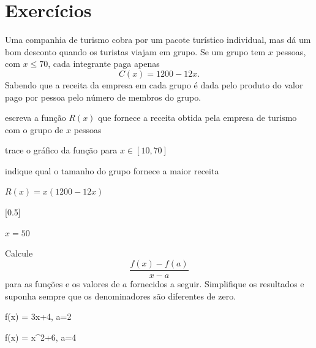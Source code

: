 \section{Exercícios}

\begin{exercises*}

\begin{exercise}
  Uma companhia de turismo cobra  por um pacote turístico
  individual, mas dá um bom desconto quando os turistas viajam em grupo. Se um
  grupo tem $x$ pessoas, com $x \leq 70$, cada integrante paga apenas
  \[
    C(x) = 1200 - 12x.
  \]
  Sabendo que a receita da empresa em cada grupo é dada pelo produto do valor
  pago por pessoa pelo número de membros do grupo.
  \begin{alphalist}
    \item escreva a função $R(x)$ que fornece a receita obtida pela empresa de
          turismo com o grupo de $x$ pessoas
    \item trace o gráfico da função para $x \in [10, 70]$
    \item indique qual o tamanho do grupo fornece a maior receita
  \end{alphalist}

  \begin{answer}
    \begin{alphalist}
      \item $R(x)=x(1200-12x)$
      \item {}[0.5]
      \item $x=50$
    \end{alphalist}
  \end{answer}
\end{exercise}

\begin{exercise}
  Calcule
  \[
    \frac{f(x)-f(a)}{x-a}
  \]
  para as funções e os valores de $a$ fornecidos a seguir. Simplifique os
  resultados e suponha sempre que os denominadores são diferentes de zero.
  \begin{mathlist}
    \item f(x) = 3x+4,  \qquad a=2
    \item f(x) = x^2+6, \qquad a=4
  \end{mathlist}


\end{exercise}
\end{exercises*}
